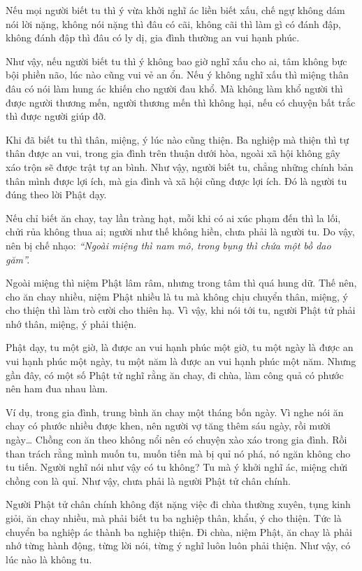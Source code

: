 \documentclass[
  12pt,
  oneside]{book}
\begin{document}
Nếu mọi người biết tu thì ý vừa khởi nghĩ ác liền biết xấu, chế ngự không dám nói lời nặng, không nói nặng thì đâu có cãi, không cãi thì làm gì có đánh đập, không đánh đập thì đâu có ly dị, gia đình thường an vui hạnh phúc.

Như vậy, nếu người biết tu thì ý không bao giờ nghĩ xấu cho ai, tâm không bực bội phiền não, lúc nào cũng vui vẻ an ổn. Nếu ý không nghĩ xấu thì miệng thân đâu có nói làm hung ác khiến cho người đau khổ. Mà không làm khổ người thì được người thương mến, người thương mến thì không hại, nếu có chuyện bất trắc thì được người giúp đỡ.

Khi đã biết tu thì thân, miệng, ý lúc nào cũng thiện. Ba nghiệp mà thiện thì tự thân được an vui, trong gia đình trên thuận dưới hòa, ngoài xã hội không gây xáo trộn sẽ được trật tự an bình. Như vậy, người biết tu, chẳng những chính bản thân mình được lợi ích, mà gia đình và xã hội cũng được lợi ích. Đó là người tu đúng theo lời Phật dạy.

Nếu chỉ biết ăn chay, tay lần tràng hạt, mỗi khi có ai xúc phạm đến thì la lối, chửi rủa không thua ai; người như thế không hiền, chưa phải là người tu. Do vậy, nên bị chế nhạo: \emph{``Ngoài miệng thì nam mô, trong bụng thì chứa một bồ dao găm''.}

Ngoài miệng thì niệm Phật lâm râm, nhưng trong tâm thì quá hung dữ. Thế nên, cho ăn chay nhiều, niệm Phật nhiều là tu mà không chịu chuyển thân, miệng, ý cho thiện thì làm trò cười cho thiên hạ. Vì vậy, khi nói tới tu, người Phật tử phải nhớ thân, miệng, ý phải thiện.

Phật dạy, tu một giờ, là được an vui hạnh phúc một giờ, tu một ngày là được an vui hạnh phúc một ngày, tu một năm là được an vui hạnh phúc một năm. Nhưng gần đây, có một số Phật tử nghĩ rằng ăn chay, đi chùa, làm công quả có phước nên ham đua nhau làm.

Ví dụ, trong gia đình, trung bình ăn chay một tháng bốn ngày. Vì nghe nói ăn chay có phước nhiều được khen, nên người vợ tăng thêm sáu ngày, rồi mười ngày\ldots{} Chồng con ăn theo không nổi nên có chuyện xào xáo trong gia đình. Rồi than trách rằng mình muốn tu, muốn tiến mà bị quỉ nó phá, nó ngăn không cho tu tiến. Người nghĩ nói như vậy có tu không? Tu mà ý khởi nghĩ ác, miệng chửi chồng con là quỉ. Như vậy, chưa phải là người Phật tử chân chính.

Người Phật tử chân chính không đặt nặng việc đi chùa thường xuyên, tụng kinh giỏi, ăn chay nhiều, mà phải biết tu ba nghiệp thân, khẩu, ý cho thiện. Tức là chuyển ba nghiệp ác thành ba nghiệp thiện. Đi chùa, niệm Phật, ăn chay là phải nhớ từng hành động, từng lời nói, từng ý nghĩ luôn luôn phải thiện. Như vậy, có lúc nào là không tu.
\end{document}
